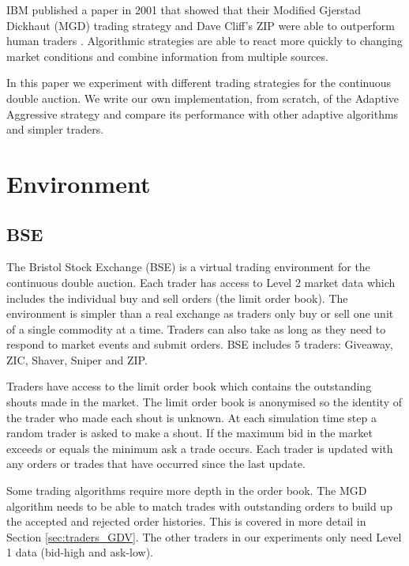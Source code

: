 \documentclass[preprint]{acm_proc_article-sp} %
\begin{document}
IBM published a paper in 2001 that showed that their Modified Gjerstad Dickhaut
(MGD) trading strategy and Dave Cliff's ZIP were able to outperform human
traders \cite{ibm_human}.  Algorithmic strategies are able to react more
quickly to changing market conditions and combine information from multiple
sources.

In this paper we experiment with different trading strategies for the
continuous double auction.  We write our own implementation, from scratch, of the Adaptive
Aggressive strategy \cite{AA_thesis} and compare its performance with other
adaptive algorithms and simpler traders.\\



\section{Environment} \label{sec:environment}
\subsection{BSE} \label{sec:BSE}
The Bristol Stock Exchange (BSE) is a virtual trading environment for the
continuous double auction. Each trader has access to Level 2 market data which
includes the individual buy and sell orders (the limit order book). The
environment is simpler than a real exchange as traders only buy or sell one
unit of a single commodity at a time. Traders can also take as long as they
need to respond to market events and submit orders. BSE includes 5 traders: Giveaway, ZIC, Shaver, Sniper and ZIP.

Traders have access to the limit order book which contains the outstanding
shouts made in the market. The limit order book is anonymised so the identity
of the trader who made each shout is unknown. At each simulation time step a
random trader is asked to make a shout. If the maximum bid in the market
exceeds or equals the minimum ask a trade occurs. Each trader is updated with
any orders or trades that have occurred since the last update.

Some trading algorithms require more depth in the order book. The MGD algorithm needs to be able to match trades with
outstanding orders to build up the accepted and rejected order histories.
This is covered in more detail in Section \ref{sec:traders_GDV}. The
other traders in our experiments only need Level 1 data
(bid-high and ask-low).
\end{document}
